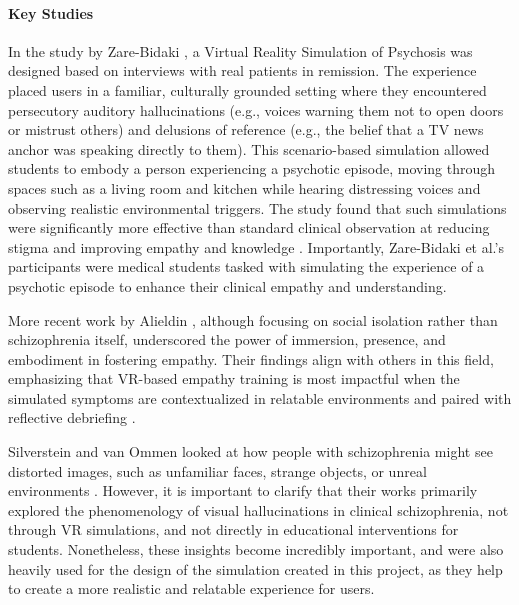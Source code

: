 \paragraph{Key Studies}

In the study by Zare-Bidaki \cite{Zare-Bidaki2022}, a Virtual Reality Simulation of Psychosis was designed based on interviews with real patients in remission. The experience placed users in a familiar, culturally grounded setting where they encountered persecutory auditory hallucinations (e.g., voices warning them not to open doors or mistrust others) and delusions of reference (e.g., the belief that a TV news anchor was speaking directly to them). This scenario-based simulation allowed students to embody a person experiencing a psychotic episode, moving through spaces such as a living room and kitchen while hearing distressing voices and observing realistic environmental triggers. The study found that such simulations were significantly more effective than standard clinical observation at reducing stigma and improving empathy and knowledge \cite{Zare-Bidaki2022}. Importantly, Zare-Bidaki et al.'s participants were medical students tasked with simulating the experience of a psychotic episode to enhance their clinical empathy and understanding.

\vspace{1em}

More recent work by Alieldin \cite{Alieldin2024}, although focusing on social isolation rather than schizophrenia itself, underscored the power of immersion, presence, and embodiment in fostering empathy. Their findings align with others in this field, emphasizing that VR-based empathy training is most impactful when the simulated symptoms are contextualized in relatable environments and paired with reflective debriefing \cite{Alieldin2024}.

Silverstein \cite{Silverstein2021} and van Ommen \cite{Vanommen2019} looked at how people with schizophrenia might see distorted images, such as unfamiliar faces, strange objects, or unreal environments \cite{Silverstein2021,Vanommen2019}. However, it is important to clarify that their works primarily explored the phenomenology of visual hallucinations in clinical schizophrenia, not through VR simulations, and not directly in educational interventions for students. Nonetheless, these insights become incredibly important, and were also heavily used for the design of the simulation created in this project, as they help to create a more realistic and relatable experience for users.

